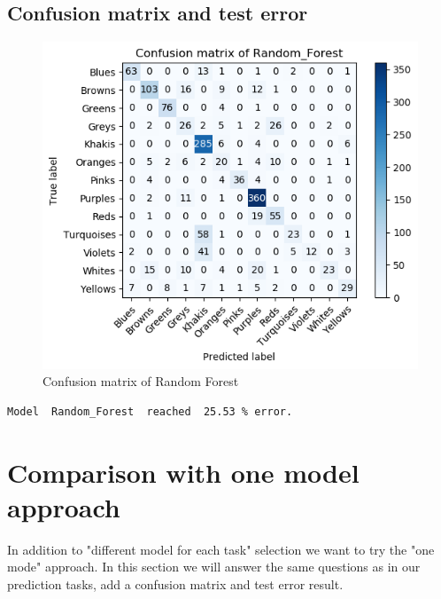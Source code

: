 \documentclass[12pt]{article}
\begin{document}
\newpage
\subsection{Confusion matrix and test error}
\begin{figure}[htp]
\centering
\includegraphics[width=\textwidth]{confusion_matrix/confusion_fig}
\caption{Confusion matrix of Random Forest}
\end{figure}

\begin{verbatim}
Model  Random_Forest  reached  25.53 % error.
\end{verbatim}

\newpage
\section{Comparison with one model approach}
In addition to "different model for each task" selection we want to try the "one mode" approach. In this section we will answer the same questions as in our prediction tasks, add a confusion matrix and test error result.
\end{document}
